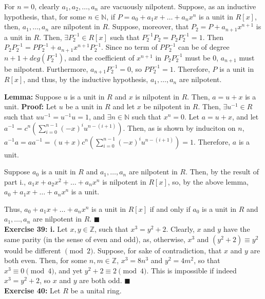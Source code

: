 \documentclass{article}%
\begin{document}
For $n = 0$, clearly $a_1, a_2, \ldots, a_n$ are vacuously nilpotent. Suppose,
as an inductive hypothesis, that, for some $n \in \mathbb{N}$, if $P =
a_0 + a_1x + \ldots + a_nx^n$ is a unit in $R[x]$, then, $a_1,\ldots,a_n$ are
nilpotent in $R$. Suppose, moreover, that $P_2 = P + a_{n + 1}x^{n + 1}$ is a
unit in $R$. Then, $\exists P_2^{-1} \in R[x]$ such that $P_2^{-1}P_2 =
P_2P_2^{-1} = 1$. Then $P_2P_2^{-1} = PP_2^{-1} + a_{n + 1}x^{n + 1}P_2^{-1}$.
Since no term of $PP_2^{-1}$ can be of degree $n + 1 + deg(P_2^{-1})$, and
the coefficient of $x^{n + 1}$ in $P_2P_2^{-1}$ must be $0$, $a_{n + 1}$ must
be nilpotent. Furthermore, $a_{n + 1}P_2^{-1} = 0$, so $PP_2^{-1} = 1$.
Therefore, $P$ is a unit in $R[x]$, and thus, by the inductive hypothesis,
$a_1,\dots,a_n$ are nilpotent.

\textbf{Lemma:} Suppose $u$ is a unit in $R$ and $x$ is nilpotent in $R$.
Then, $a = u + x$ is a unit.
\textbf{Proof:} Let $u$ be a unit in $R$ and let $x$ be nilpotent in $R$.
Then, $\exists u^{-1} \in R$ such that $uu^{-1} = u^{-1}u = 1$, and
$\exists n \in \mathbb{N}$ such that $x^n = 0$. Let $a = u + x$, and let
$a^{-1} = c^n \left( \sum_{i = 0}^{n - 1}
\left(-x\right)^iu^{n - (i + 1)}\right)$. Then, as is shown by induciton on
$n$, $a^{-1}a = aa^{-1} = (u + x) c^n \left( \sum_{i = 0}^{n - 1}
\left(-x\right)^iu^{n - (i + 1)}\right) = 1$. Therefore, $a$ is a unit.

Suppose $a_0$ is a unit in $R$ and $a_1, \ldots, a_n$ are nilpotent in $R$.
Then, by the result of part i., $a_1x + a_2x^2 + \ldots + a_nx^n$ is
nilpotent in $R[x]$, so, by the above lemma, $a_0 + a_1x + \ldots + a_nx^n$
is a unit.

Thus, $a_0 + a_1x + \ldots + a_nx^n$ is a unit in $R[x]$ if and only if $a_0$
is a unit in $R$ and $a_1, \ldots, a_n$ are nilpotent in $R$.
\qquad $\blacksquare$ \\

\textbf{Exercise 39: i.} Let $x, y \in \mathbb{Z}$, such that $x^3 = y^2 + 2$.
Clearly, $x$ and $y$ have the same parity (in the sense of even and odd), as,
otherwise, $x^3$ and $(y^2 + 2) \equiv y^2$ would be different $\pmod 2$.
Suppose, for sake of contradiction, that $x$ and $y$ are both even. Then,
for some $n, m \in \mathbb{Z}$, $x^3 = 8n^3$ and $y^2 = 4m^2$, so that
$x^3 \equiv 0 \pmod 4$, and yet $y^2 + 2 \equiv 2 \pmod 4$. This is
impossible if indeed $x^3 = y^2 + 2$, so $x$ and $y$ are both odd. \qquad
$\blacksquare$ \\

\textbf{Exercise 40:} Let $R$ be a unital ring.
\end{document}
